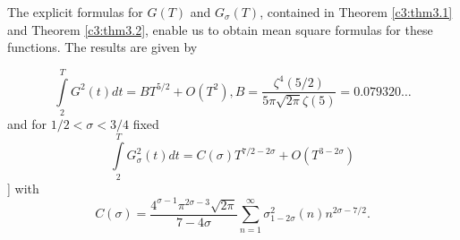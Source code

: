 The explicit formulas for $G(T)$ and $G_\sigma(T)$, contained in
Theorem \ref{c3:thm3.1} and Theorem \ref{c3:thm3.2}, enable us to
obtain mean square formulas for these functions. The results are given
by

\begin{thm}\label{c3:thm3.5}
  \begin{equation}
    \int\limits_2^{T} G^2 (t) dt = B T^{5/2} + O(T^2), B =
    \frac{\zeta^4 (5/2)}{5 \pi \sqrt{2 \pi} \zeta (5)} =
    0.079320\ldots \label{c3:eq3.65}
  \end{equation}
  and for $1/2 < \sigma < 3/4$ fixed
  \begin{equation}
    \int\limits_{2}^T G_\sigma^2 (t) dt = C(\sigma)T^{7/2-2 \sigma} +
    O(T^{3-2\sigma}) \label{c3:eq3.66}
  \end{equation}]
    with
    \begin{equation}
      C(\sigma) = \frac{4^{\sigma-1} \pi^{2 \sigma-3}\sqrt{2 \pi}}{7-
        4 \sigma} \sum_{n=1}^\infty \sigma^2_{1-2\sigma} (n) n^{2
        \sigma- 7/2}.\label{c3:eq3.67}
    \end{equation}
\end{thm}

